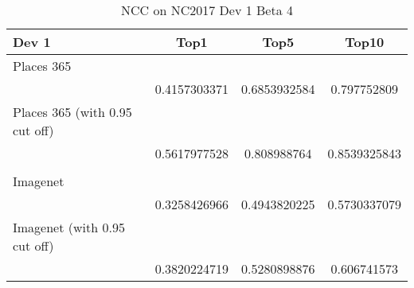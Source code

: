 \documentclass{article}
\begin{document}
\begin{table}[H]
\centering
\caption{NCC on NC2017 Dev 1 Beta 4}
\label{sg_dev1}
\begin{tabular}{|l|S[round-precision=2]|S[round-precision=2]|S[round-precision=2]|}
\hline
      Dev 1                         & Top1         & Top5         & Top10        \\ \hline
Places 365                     &         &         &         \\ \hline
                               & 0.4157303371 & 0.6853932584 & 0.797752809  \\ \hline
Places 365 (with 0.95 cut off) &         &         &         \\ \hline
                               & 0.5617977528 & 0.808988764  & 0.8539325843 \\ \hline
                               &              &              &              \\ \hline
Imagenet                           &         &         &         \\ \hline
                               & 0.3258426966 & 0.4943820225 & 0.5730337079 \\ \hline
Imagenet (with 0.95 cut off)       &         &         &         \\ \hline
                               & 0.3820224719 & 0.5280898876 & 0.606741573  \\ \hline
\end{tabular}
\end{table}
\end{document}

